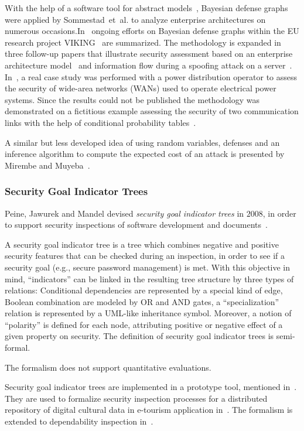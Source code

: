 \documentclass[a4paper]{article}
\begin{document}
With the help of a software tool for abstract models~\cite{JoJoSoUl}, Bayesian
defense graphs were applied by Sommestad~et~al. to analyze enterprise
architectures on numerous occasions.In~\cite{EkSo} ongoing efforts on Bayesian
defense graphs within the EU research project VIKING~\cite{Website_VIKING} are
summarized. The methodology is expanded in three follow-up papers that
illustrate security assessment based on an enterprise architecture
model~\cite{SoEkJo4,SoEkJo2} and information flow during a spoofing attack on a
server~\cite{FrSoEkJo}. In~\cite{SoEkNo}, a real case study was performed with a
power distribution operator to assess the security of wide-area networks (WANs)
used to operate electrical power systems. Since the results could not be
published the methodology was demonstrated on a fictitious example assessing the
security of two communication links with the help of conditional probability
tables~\cite{SoEkNo}.

A similar but less developed idea of using random variables, defenses and an
inference algorithm to compute the expected cost of an attack is presented by
Mirembe and Muyeba~\cite{MiMu}. 

\subsubsection{Security Goal Indicator Trees} 
\label{sec:security_goal_indicator_trees}

Peine, Jawurek and Mandel devised \emph{security goal indicator trees} in
$2008$, in order to support security inspections of software development and
documents~\cite{PeJaMa}.

A security goal indicator tree is a tree which combines negative and positive
security features that can be checked during an inspection, in order to see if a
security goal (e.g., secure password management) is met. With this objective in
mind, ``indicators'' can be linked in the resulting tree structure by three
types of relations: Conditional dependencies are represented by a special kind
of edge, Boolean combination are modeled by OR and AND gates, a
``specialization'' relation is represented by a UML-like inheritance symbol.
Moreover, a notion of ``polarity'' is defined for each node, attributing
positive or negative effect of a given property on security. The definition of
security goal indicator trees is semi-formal.

The formalism does not support quantitative evaluations.

Security goal indicator trees are implemented in a prototype tool, mentioned
in~\cite{PeJaMa}. They are used to formalize security inspection processes for
a distributed repository of digital cultural data in e-tourism application
in~\cite{JuElBaRa}. The formalism is extended to dependability inspection
in~\cite{KlElEs}.
\end{document}
